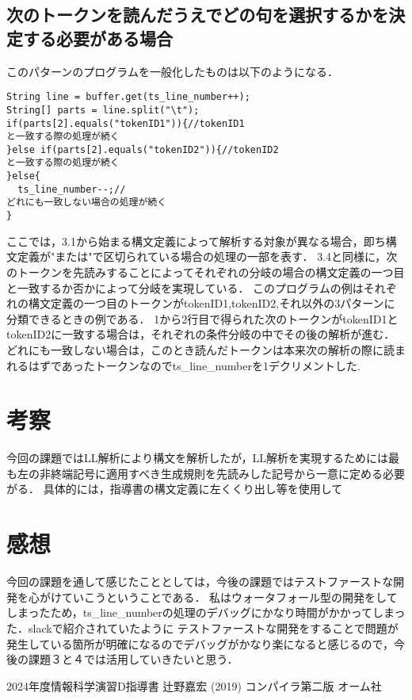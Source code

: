 \documentclass[dvipdfmx]{jarticle}
\begin{document}
\subsection{次のトークンを読んだうえでどの句を選択するかを決定する必要がある場合}
このパターンのプログラムを一般化したものは以下のようになる．
\begin{lstlisting}
String line = buffer.get(ts_line_number++);
String[] parts = line.split("\t");
if(parts[2].equals("tokenID1")){//tokenID1
と一致する際の処理が続く
}else if(parts[2].equals("tokenID2")){//tokenID2
と一致する際の処理が続く
}else{ 
  ts_line_number--;//
どれにも一致しない場合の処理が続く
}
\end{lstlisting}
ここでは，3.1から始まる構文定義によって解析する対象が異なる場合，即ち構文定義が"または"で区切られている場合の処理の一部を表す．
3.4と同様に，次のトークンを先読みすることによってそれぞれの分岐の場合の構文定義の一つ目と一致するか否かによって分岐を実現している．
このプログラムの例はそれぞれの構文定義の一つ目のトークンがtokenID1,tokenID2,それ以外の3パターンに分類できるときの例である．
1から2行目で得られた次のトークンがtokenID1とtokenID2に一致する場合は，それぞれの条件分岐の中でその後の解析が進む．
どれにも一致しない場合は，このとき読んだトークンは本来次の解析の際に読まれるはずであったトークンなのでts\_line\_numberを1デクリメントした.
\section{考察}
今回の課題ではLL解析により構文を解析したが，LL解析を実現するためには最も左の非終端記号に適用すべき生成規則を先読みした記号から一意に定める必要がる．
具体的には，指導書の構文定義に左くくり出し等を使用して
\section{感想}
今回の課題を通して感じたこととしては，今後の課題ではテストファーストな開発を心がけていこうということである．
私はウォータフォール型の開発をしてしまったため，ts\_line\_numberの処理のデバッグにかなり時間がかかってしまった．slackで紹介されていたように
テストファーストな開発をすることで問題が発生している箇所が明確になるのでデバッグがかなり楽になると感じるので，今後の課題３と４では活用していきたいと思う．
\begin{thebibliography}{99}
     2024年度情報科学演習D指導書
     辻野嘉宏 (2019) コンパイラ第二版 オーム社
\end{thebibliography}
\end{document}

